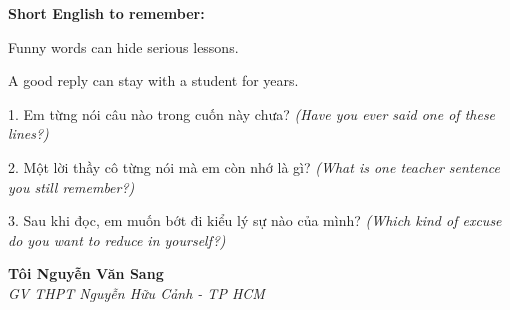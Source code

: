 \begin{ghinhoanh}
\textbf{Short English to remember:}

Funny words can hide serious lessons.

A good reply can stay with a student for years.
\end{ghinhoanh}

\begin{tuhocnhanh}
1. Em từng nói câu nào trong cuốn này chưa? \textit{(Have you ever said one of these lines?)}

2. Một lời thầy cô từng nói mà em còn nhớ là gì? \textit{(What is one teacher sentence you still remember?)}

3. Sau khi đọc, em muốn bớt đi kiểu lý sự nào của mình? \textit{(Which kind of excuse do you want to reduce in yourself?)}
\end{tuhocnhanh}

\begin{flushright}
\textbf{Tôi Nguyễn Văn Sang}\\
\textit{GV THPT Nguyễn Hữu Cảnh - TP HCM}
\end{flushright}

\ngancach